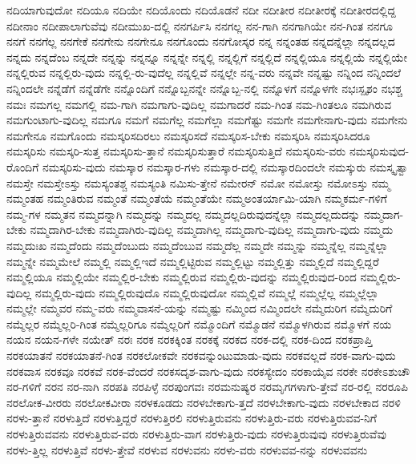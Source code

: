 {ನದಿಯಾಗುವುದೋ
ನದಿಯೂ
ನದಿಯೇ
ನದಿಯೊಂದು
ನದಿಯೊಡನೆ
ನದೀ
ನದೀತೀರ
ನದೀತೀರಕ್ಕೆ
ನದೀತೀರದಲ್ಲಿದ್ದ
ನದೀನಾಂ
ನದೀಪಾಲಾಗುವೆವು
ನದೀಮುಖ-ದಲ್ಲಿ
ನನಗರ್ಪಿಸಿ
ನನಗಲ್ಲ
ನನ-ಗಾಗಿ
ನನಗಾಗಿಯೇ
ನನ-ಗಿಂತ
ನನಗೂ
ನನಗೆ
ನನಗೆಲ್ಲ
ನನಗೇಕೆ
ನನಗೇನು
ನನಗೇನೂ
ನನಗೊಂದು
ನನಗೋಸ್ಕರ
ನನ್ನ
ನನ್ನಂತಹ
ನನ್ನದನ್ನೆಲ್ಲಾ
ನನ್ನದಲ್ಲದ
ನನ್ನದು
ನನ್ನದೆಂಬ
ನನ್ನದೇ
ನನ್ನನ್ನು
ನನ್ನನ್ನೂ
ನನ್ನನ್ನೇ
ನನ್ನಲ್ಲಿ
ನನ್ನಲ್ಲಿಗೆ
ನನ್ನಲ್ಲಿದೆ
ನನ್ನಲ್ಲಿಯೂ
ನನ್ನಲ್ಲಿಯೆ
ನನ್ನಲ್ಲಿಯೇ
ನನ್ನಲ್ಲಿರುವ
ನನ್ನಲ್ಲಿರು-ವುದು
ನನ್ನಲ್ಲಿ-ರು-ವುದೆಲ್ಲ
ನನ್ನಲ್ಲಿವೆ
ನನ್ನಲ್ಲೇ
ನನ್ನ-ವರು
ನನ್ನವೇ
ನನ್ನಷ್ಟು
ನನ್ನಿಂದ
ನನ್ನಿಂದಲೆ
ನನ್ನಿಂದಲೇ
ನನ್ನೆಡೆಗೆ
ನನ್ನೆಡೆಗೇ
ನನ್ನೊಂದಿಗೆ
ನನ್ನೊಬ್ಬನನ್ನೇ
ನನ್ನೊಬ್ಬ-ನಲ್ಲಿ
ನನ್ನೊಳಗೆ
ನನ್ನೊಳಗೇ
ನಭಃಸ್ಪೃಶಂ
ನಭಶ್ಚ
ನಮಃ
ನಮಗಲ್ಲ
ನಮಗಲ್ಲಿ
ನಮ-ಗಾಗಿ
ನಮಗಾಗು-ವುದಿಲ್ಲ
ನಮಗಾದರೆ
ನಮ-ಗಿಂತ
ನಮ-ಗಿಂತಲೂ
ನಮಗಿರುವ
ನಮಗುಂಟಾಗು-ವುದಿಲ್ಲ
ನಮಗೂ
ನಮಗೆ
ನಮಗೆಲ್ಲ
ನಮಗೆಲ್ಲಾ
ನಮಗೆಷ್ಟು
ನಮಗೇ
ನಮಗೇನಾಗು-ವುದು
ನಮಗೇನು
ನಮಗೇನೂ
ನಮಗೊಂದು
ನಮಸ್ಕರಿಸದಿರಲು
ನಮಸ್ಕರಿಸದೆ
ನಮಸ್ಕರಿಸ-ಬೇಕು
ನಮಸ್ಕರಿಸಿ
ನಮಸ್ಕರಿಸಿದರೂ
ನಮಸ್ಕರಿಸು
ನಮಸ್ಕರಿ-ಸುತ್ತ
ನಮಸ್ಕರಿಸು-ತ್ತಾನೆ
ನಮಸ್ಕರಿಸುತ್ತಾರೆ
ನಮಸ್ಕರಿಸುತ್ತಿದೆ
ನಮಸ್ಕರಿಸು-ವರು
ನಮಸ್ಕರಿಸುವುದ-ರೊಂದಿಗೆ
ನಮಸ್ಕರಿಸು-ವುದು
ನಮಸ್ಕಾರ
ನಮಸ್ಕಾರ-ಗಳು
ನಮಸ್ಕಾರ-ದಲ್ಲಿ
ನಮಸ್ಕಾರದಿಂದಲೇ
ನಮಸ್ಕುರು
ನಮಸ್ಕೃತ್ವಾ
ನಮಸ್ತೇ
ನಮಸ್ತೇಽಸ್ತು
ನಮಸ್ಯಂತಶ್ಚ
ನಮಸ್ಯಂತಿ
ನಮಿಸು-ತ್ತೇನೆ
ನಮೇರನ್
ನಮೋ
ನಮೋಸ್ತು
ನಮೋಽಸ್ತು
ನಮ್ಮ
ನಮ್ಮಂತಹ
ನಮ್ಮಂತಿರುವ
ನಮ್ಮಂತೆ
ನಮ್ಮಂತೆಯೆ
ನಮ್ಮಂತೆಯೇ
ನಮ್ಮಅಂತರ್ಯಾಮಿ-ಯಾಗಿ
ನಮ್ಮಕರ್ಮ-ಗಳಿಗೆ
ನಮ್ಮ-ಗಳ
ನಮ್ಮತನ
ನಮ್ಮದನ್ನಾಗಿ
ನಮ್ಮದನ್ನು
ನಮ್ಮದಲ್ಲ
ನಮ್ಮದಲ್ಲದಿರುವುದನ್ನೆಲ್ಲಾ
ನಮ್ಮದಲ್ಲದುದನ್ನು
ನಮ್ಮದಾಗ-ಬೇಕು
ನಮ್ಮದಾಗಿರ-ಬೇಕು
ನಮ್ಮದಾಗಿರು-ವುದಿಲ್ಲ
ನಮ್ಮದಾಗಿಲ್ಲ
ನಮ್ಮದಾಗು-ವುದಿಲ್ಲ
ನಮ್ಮದಾಗು-ವುದು
ನಮ್ಮದು
ನಮ್ಮದುಃಖ
ನಮ್ಮದೆಂದು
ನಮ್ಮದೆಂಬುದು
ನಮ್ಮದೆಂಬುವ
ನಮ್ಮದೆಲ್ಲ
ನಮ್ಮದೇ
ನಮ್ಮನ್ನು
ನಮ್ಮನ್ನೆಲ್ಲ
ನಮ್ಮನ್ನೆಲ್ಲಾ
ನಮ್ಮನ್ನೇ
ನಮ್ಮಮೇಲೆ
ನಮ್ಮಲ್ಲಿ
ನಮ್ಮಲ್ಲಿಇದೆ
ನಮ್ಮಲ್ಲಿಟ್ಟಿರುವ
ನಮ್ಮಲ್ಲಿಟ್ಟು
ನಮ್ಮಲ್ಲಿತ್ತು
ನಮ್ಮಲ್ಲಿದೆ
ನಮ್ಮಲ್ಲಿದ್ದರೆ
ನಮ್ಮಲ್ಲಿಯೂ
ನಮ್ಮಲ್ಲಿಯೇ
ನಮ್ಮಲ್ಲಿರ-ಬೇಕು
ನಮ್ಮಲ್ಲಿರುವ
ನಮ್ಮಲ್ಲಿರು-ವುದನ್ನು
ನಮ್ಮಲ್ಲಿರುವುದ-ರಿಂದ
ನಮ್ಮಲ್ಲಿರು-ವುದಿಲ್ಲ
ನಮ್ಮಲ್ಲಿರು-ವುದು
ನಮ್ಮಲ್ಲಿರುವುದೊ
ನಮ್ಮಲ್ಲಿರುವುದೋ
ನಮ್ಮಲ್ಲಿವೆ
ನಮ್ಮಲ್ಲೆ
ನಮ್ಮಲ್ಲೆಲ್ಲ
ನಮ್ಮಲ್ಲೆಲ್ಲಾ
ನಮ್ಮಲ್ಲೇ
ನಮ್ಮವರ
ನಮ್ಮ-ವರು
ನಮ್ಮವಾಸನೆ-ಯನ್ನು
ನಮ್ಮಷ್ಟು
ನಮ್ಮಿಂದ
ನಮ್ಮಿಂದಲೇ
ನಮ್ಮೆದುರಿಗ
ನಮ್ಮೆದುರಿಗೆ
ನಮ್ಮೆಲ್ಲರ
ನಮ್ಮೆಲ್ಲರಿ-ಗಿಂತ
ನಮ್ಮೆಲ್ಲರಿಗೂ
ನಮ್ಮೆಲ್ಲರಿಗೆ
ನಮ್ಮೊಂದಿಗೆ
ನಮ್ಮೊಡನೆ
ನಮ್ಮೊಳಗಿರುವ
ನಮ್ಮೊಳಗೆ
ನಯ
ನಯನ
ನಯನ-ಗಳೇ
ನಯೇತ್
ನರಃ
ನರಕ
ನರಕಕ್ಕಿಂತ
ನರಕಕ್ಕೆ
ನರಕದ
ನರಕ-ದಲ್ಲಿ
ನರಕ-ದಿಂದ
ನರಕಪ್ರಾಪ್ತಿ
ನರಕಯಾತನೆ
ನರಕಯಾತನೆ-ಗಿಂತ
ನರಕಲೋಕವೇ
ನರಕವನ್ನುಂಟುಮಾಡು-ವುದು
ನರಕವಲ್ಲದೆ
ನರಕ-ವಾಗು-ವುದು
ನರಕವಾಸ
ನರಕವೂ
ನರಕವೆ
ನರಕ-ವೆಂದರೆ
ನರಕಸದೃಶ-ವಾಗು-ವುದು
ನರಕಸ್ಯೇದಂ
ನರಕಾಯೈವ
ನರಕೇ
ನರಕೇಽಶುಚೌ
ನರ-ಗಳಿಗೆ
ನರನ
ನರ-ನಾಗಿ
ನರಪತಿ
ನರಪಿಳ್ಳೆ
ನರಪುಂಗವಃ
ನರಮನುಷ್ಯರ
ನರಮೃಗಗಳಾಗು-ತ್ತೇವೆ
ನರ-ರಲ್ಲಿ
ನರರೂಪಿ
ನರಲೋಕ-ವೀರರು
ನರಲೋಕವೀರಾ
ನರಳಕೂಡದು
ನರಳಬೇಕಾಗು-ತ್ತದೆ
ನರಳಬೇಕಾಗು-ವುದು
ನರಳಬೇಕಾದ
ನರಳಿ
ನರಳು-ತ್ತಾನೆ
ನರಳುತ್ತಿದೆ
ನರಳುತ್ತಿದ್ದರೆ
ನರಳುತ್ತಿರಲಿ
ನರಳುತ್ತಿರುವನು
ನರಳುತ್ತಿರು-ವರು
ನರಳುತ್ತಿರುವವ-ನಿಗೆ
ನರಳುತ್ತಿರುವವನು
ನರಳುತ್ತಿರುವ-ವರು
ನರಳುತ್ತಿರು-ವಾಗ
ನರಳುತ್ತಿರು-ವುದು
ನರಳುತ್ತಿರುವುವು
ನರಳುತ್ತಿರುವೆವು
ನರಳು-ತ್ತಿಲ್ಲ
ನರಳುತ್ತಿವೆ
ನರಳು-ತ್ತೇವೆ
ನರಳುವ
ನರಳುವನು
ನರಳು-ವರು
ನರಳುವವ-ನನ್ನು
ನರಳುವವನು
}

